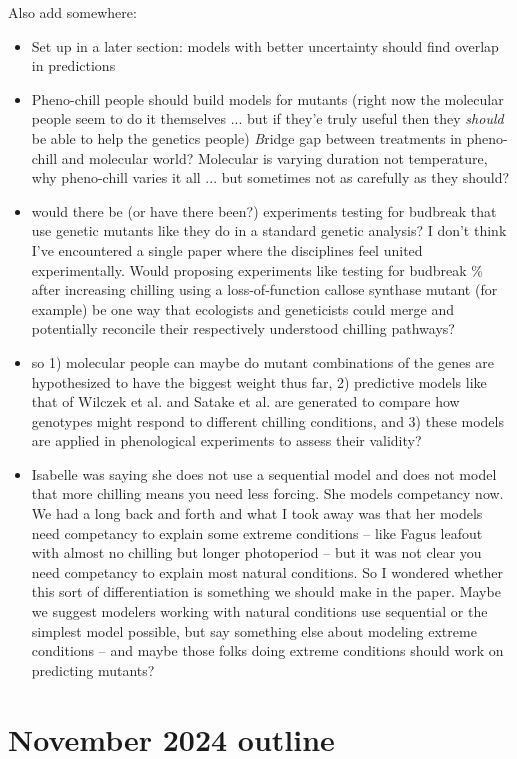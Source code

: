 \documentclass[11pt,letter]{article}
\begin{document}
Also add somewhere:
\begin{itemize}
\item Set up in a later section: models with better uncertainty should find overlap in predictions
\item Pheno-chill people should build models for mutants (right now the molecular people seem to do it themselves ... but if they'e truly useful then they \emph{should} be able to help the genetics people)
\emph Bridge gap between treatments in pheno-chill and molecular world? Molecular is varying duration not temperature, why pheno-chill varies it all ... but sometimes not as carefully as they should? 
\item would there be (or have there been?) experiments testing for budbreak that use genetic mutants like they do in a standard genetic analysis? I don't think I've encountered a single paper where the disciplines feel united experimentally. Would proposing experiments like testing for budbreak \% after increasing chilling using a loss-of-function callose synthase mutant (for example) be one way that ecologists and geneticists could merge and potentially reconcile their respectively understood chilling pathways?
\item so 1) molecular people can maybe do mutant combinations of the genes are hypothesized to have the biggest weight thus far, 2) predictive models like that of Wilczek et al. and Satake et al. are generated to compare how genotypes might respond to different chilling conditions, and 3) these models are applied in phenological experiments to assess their validity?
\item Isabelle was saying she does not use a sequential model and does not model that more chilling means you need less forcing. She models competancy now. We had a long back and forth and what I took away was that her models need competancy to explain some extreme conditions -- like Fagus leafout with almost no chilling but longer photoperiod -- but it was not clear you need competancy to explain most natural conditions. So I wondered whether this sort of differentiation is something we should make in the paper. Maybe we suggest modelers working with natural conditions use sequential or the simplest model possible, but say something else about modeling extreme conditions -- and maybe those folks doing extreme conditions should work on predicting mutants?
\end{itemize}

\section{November 2024 outline} %
\end{document}
